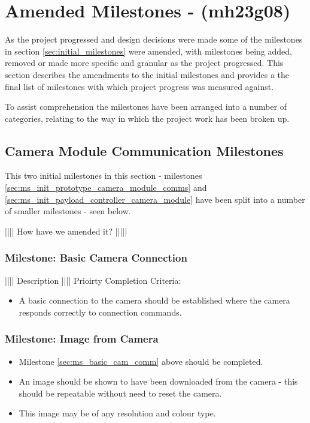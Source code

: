 
\section{Amended Milestones - (mh23g08)}
\label{sec:amended_milestones}
As the project progressed and design decisions were made some of the milestones in section
\ref{sec:initial_milestones} were amended, with milestones being added, removed or made more
specific and granular as the project progressed. This section describes the amendments to the
initial milestones and provides a the final list of milestones with which project progress was measured
against.

To assist comprehension the milestones have been arranged into a number of categories,
relating to the way in which the project work has been broken up. 

\subsection{Camera Module Communication Milestones}
This two initial milestones in this section - milestones \ref{sec:ms_init_prototype_camera_module_comms}
and \ref{sec:ms_init_payload_controller_camera_module}  have been split into a number of smaller
milestones - seen below.

|||| How have we amended it? |||||

	\subsubsection{Milestone: Basic Camera Connection}
		|||| Description ||||
		Prioirty
		Completion Criteria:
		\label{sec:ms_basic_cam_comm}
		\begin{itemize}
			\item 	A basic connection to the camera should be established
				where the camera responds correctly to connection 
				commands.
		\end{itemize}

	\subsubsection{Milestone: Image from Camera}
		\label{sec:ms_img_from_cam}
		\begin{itemize}
			\item 	Milestone \ref{sec:ms_basic_cam_comm} above should
				be completed.
			\item 	An image should be shown to have been downloaded 
				from the camera - this should be repeatable without
				need to reset the camera.
			\item 	This image may be of any resolution and colour type.
		\end{itemize} 

